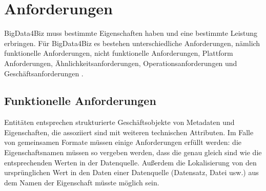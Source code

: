 \section{Anforderungen}
\label{sec:AnforderungenBD4B}



BigData4Biz muss bestimmte Eigenschaften haben und eine bestimmte Leistung erbringen. Für BigData4Biz es bestehen unterschiedliche Anforderungen, nämlich funktionelle Anforderungen, nicht funktionelle Anforderungen, Plattform Anforderungen, Ähnlichkeitsanforderungen, Operationsanforderungen und Geschäftsanforderungen \cite{DIB18}.

\subsection{Funktionelle Anforderungen}
\label{subsec:FunktAnforderungen}

Entitäten entsprechen strukturierte Geschäftsobjekte von Metadaten und Eigenschaften, die assoziiert sind mit weiteren technischen Attributen. Im Falle von gemeinsamen Formate müssen einige Anforderungen erfüllt werden: die Eigenschaftsnamen müssen so vergeben werden, dass die genau gleich sind wie die entsprechenden Werten in der Datenquelle. Außerdem die Lokalisierung von den ursprünglichen Wert in den Daten einer Datenquelle (Datensatz, Datei usw.) aus dem Namen der Eigenschaft müsste möglich sein. 

